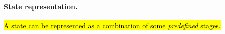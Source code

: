 \documentclass{article}
\begin{document}


\paragraph{State representation.} \hl{A state can be represented as a combination of some \emph{predefined} stages.}
\end{document}
